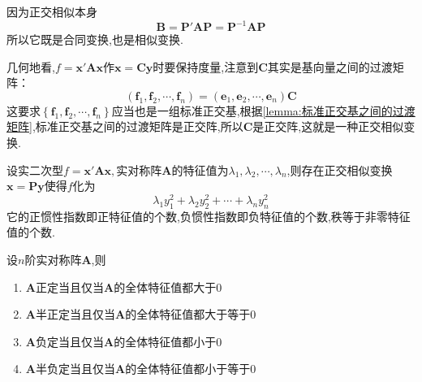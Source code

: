 \begin{red}
    \begin{remark}
        因为正交相似本身\[
        \bm{B}= \bm{P}'\bm{AP}= \bm{P}^{-1}\bm{AP}
        \]所以它既是合同变换,也是相似变换.

        几何地看,$f=\bm{x}'\bm{Ax}$作$\bm{x}=\bm{Cy}$时要保持度量,注意到$\bm{C}$其实是基向量之间的过渡矩阵：\[
        \left(
            \bm{f}_1,\bm{f}_2,\cdots,\bm{f}_n
        \right)=\left(
            \bm{e}_1,\bm{e}_2,\cdots,\bm{e}_n
        \right)\bm{C}
        \]这要求$\left\{
            \bm{f}_1,\bm{f}_2,\cdots,\bm{f}_n
        \right\}$应当也是一组标准正交基,根据\cref{lemma:标准正交基之间的过渡矩阵},标准正交基之间的过渡矩阵是正交阵,所以$\bm{C}$是正交阵,这就是一种正交相似变换.
    \end{remark}
\end{red}
\begin{green}
    \begin{corollary}[实二次型的正交相似变换]\label{cor:实二次型的正交相似变换}
        设实二次型$f=\bm{x}'\bm{Ax},$实对称阵$\bm{A}$的特征值为$\lambda_1,\lambda_2,\cdots,\lambda_n$,则存在正交相似变换$\bm{x}=\bm{Py}$使得$f$化为\[
        \lambda_1y_1^2+\lambda_2y_2^2+\cdots+\lambda_ny_n^2
        \]它的正惯性指数即正特征值的个数,负惯性指数即负特征值的个数,秩等于非零特征值的个数.
    \end{corollary}
\end{green}
\begin{green}
    \begin{corollary}[半正定与半负定的确定]\label{cor:半正定与半负定的确定}
        设$n$阶实对称阵$\bm{A}$,则\begin{enumerate}[label={\textup{(\arabic*)}}]
            \item $\bm{A}$正定当且仅当$\bm{A}$的全体特征值都大于$0$
            \item $\bm{A}$半正定当且仅当$\bm{A}$的全体特征值都大于等于$0$
            \item $\bm{A}$负定当且仅当$\bm{A}$的全体特征值都小于$0$
            \item $\bm{A}$半负定当且仅当$\bm{A}$的全体特征值都小于等于$0$
        \end{enumerate}
    \end{corollary}
\end{green}

